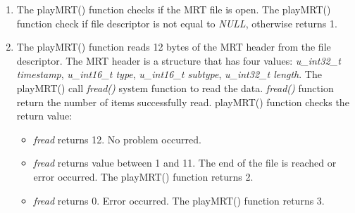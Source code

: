 \begin{enumerate}
\begin{enumerate}
  \item{The playMRT() function checks if the MRT file is open. The playMRT() function check if file descriptor is not equal  to \emph{NULL}, otherwise returns 1.}
  \item{The playMRT() function reads 12 bytes of the MRT header from the file descriptor.  The MRT header is a structure that has four values: \emph{ u\_int32\_t timestamp}, \emph{u\_int16\_t type}, \emph{u\_int16\_t subtype}, \emph{u\_int32\_t length}. The  playMRT() call \emph{fread()} system function to read the data. \emph{fread()} function return the number of items successfully read. playMRT() function checks the return value:  }
  \begin{itemize}
  \item{\emph{fread} returns 12.  No problem occurred. }
  \item{\emph{fread} returns value between 1 and 11. The end of the file is reached or error occurred. The  playMRT() function returns 2.}
  \item{\emph{fread} returns 0. Error occurred. The  playMRT() function returns 3.}
  \end{itemize}


\end{enumerate}
\end{enumerate}
